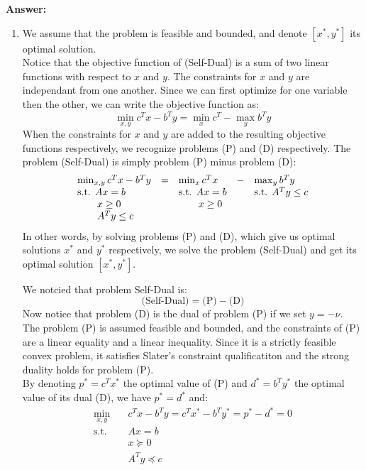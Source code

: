 \documentclass[11pt,a4paper]{article}
\newenvironment{solution}{
  \par\noindent\textbf{Answer:}\vspace{0.3em}
}{\vspace{1em}}
\begin{document}
\begin{solution}
\begin{enumerate}
        \item We assume that the problem is feasible and bounded, and denote $[x^*, y^*]$ its optimal solution.\\
        Notice that the objective function of (Self-Dual) is a sum of two linear functions with respect to $x$ and $y$. The constraints for $x$ and $y$ are independant from one another. Since we can first optimize for one variable then the other, we can write the objective function as: $$\min_{x, y} c^T x - b^T y = \min_x c^T - \max_y b^T y$$
        When the constraints for $x$ and $y$ are added to the resulting objective functions respectively, we recognize problems (P) and (D) respectively. The problem (Self-Dual) is simply problem (P) minus problem (D):$$\begin{array}{l c l c l}
            \min_{x,y} c^T x - b^T y  & = & \min_x c^T x       & - & \max_y b^T y \\
            \text{s.t. } Ax = b      &   & \text{s.t. } Ax = b &   & \text{s.t. } A^T y \le c \\
            \qquad x \ge 0           &   & \qquad x \ge 0      &   & \\
            \qquad A^T y \le c       &   &                     &   &
        \end{array}$$
        In other words, by solving problems (P) and (D), which give us optimal solutions $x^*$ and $y^*$ respectively, we solve the problem (Self-Dual) and get its optimal solution $[x^*, y^*]$.

        We notcied that problem Self-Dual is: $$\text{(Self-Dual)} = \text{(P)} - \text{(D)}$$
        Now notice that problem (D) is the dual of problem (P) if we set $y = - \nu$.\\
        The problem (P) is assumed feasible and bounded, and the constraints of (P) are a linear equality and a linear inequality. Since it is a strictly feasible convex problem, it satisfies Slater's constraint qualificatiton and the strong duality holds for problem (P).\\
        By denoting $p^* = c^T x^*$ the optimal value of (P) and $d^* = b^T y^*$ the optimal value of its dual (D), we have $p^* = d^*$ and:$$\begin{aligned}
            \min_{x, y} \quad & c^T x - b^T y = c^T x^* - b^T y^* = p^* - d^* = 0\\
            \text{s.t.} \quad & Ax = b\\
            & x \succeq 0\\
            & A^T y \preceq c
        \end{aligned}$$
    \end{enumerate}
\end{solution}
\end{document}
